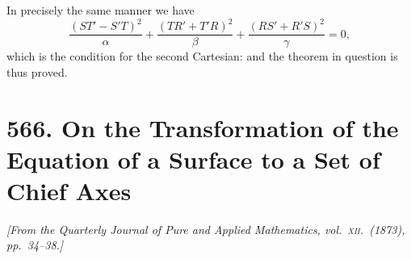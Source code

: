 \documentclass[11pt,a4paper]{article}
\begin{document}
In precisely the same manner we have
\[
\frac{(ST' - S'T)^{2}}{\alpha} + \frac{(TR' + T'R)^{2}}{\beta} + \frac{(RS' + R'S)^{2}}{\gamma} = 0,
\]
which is the condition for the second Cartesian: and the theorem in question is thus proved.

\bigskip

\section*{\textbf{566.} On the Transformation of the Equation of a Surface to a Set of Chief Axes}

\noindent\textit{[From the Quarterly Journal of Pure and Applied Mathematics, vol.\ \textsc{xii}.\ (1873), pp.~34--38.]}

\bigskip
\end{document}
